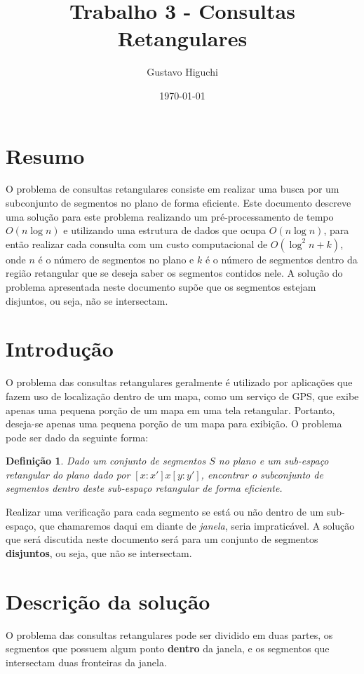 \documentclass{article}
\title{Trabalho 3 - Consultas Retangulares}
\author{Gustavo Higuchi}
\date{\today}
\newtheorem{definicao}{Definição}
\theoremstyle{definition}
\begin{document}
\maketitle
\newpage
\tableofcontents
\newpage
\section{Resumo}
\hspace*{15pt} O problema de consultas retangulares consiste em realizar
uma busca por um subconjunto de segmentos no plano de forma eficiente. 
Este documento descreve uma solução para este problema realizando um 
pré-processamento de tempo $O(n\log n)$ e utilizando uma estrutura de
dados que ocupa $O(n\log n)$, para então realizar cada consulta com um 
custo computacional de $O(\log^2 n + k)$, onde $n$ é o número de segmentos
no plano e $k$ é o número de segmentos dentro da região retangular que 
se deseja saber os segmentos contidos nele. A solução do problema apresentada
neste documento supõe que os segmentos estejam disjuntos, ou seja, não
se intersectam.

\section{Introdução}
\hspace*{15pt} O problema das consultas retangulares geralmente é utilizado
por aplicações que fazem uso de localização dentro de um mapa, como
um serviço de GPS, que exibe apenas uma pequena porção de um mapa em uma
tela retangular. Portanto, deseja-se apenas uma pequena porção de um mapa
para exibição. O problema pode ser dado da seguinte forma:\\
\begin{definicao}
    Dado um conjunto de segmentos $S$ no plano e um sub-espaço retangular 
    do plano dado por $[x:x']x[y:y']$, encontrar o subconjunto de segmentos
    dentro deste sub-espaço retangular de forma eficiente.
\end{definicao}
\hspace*{15pt}Realizar uma verificação para cada segmento se está ou não 
dentro de um sub-espaço, que chamaremos daqui em diante de \textit{janela}, 
seria impraticável. A solução que será discutida neste documento será para 
um conjunto de segmentos \textbf{disjuntos}, ou seja, que não se intersectam. 


\section{Descrição da solução}
\hspace*{15pt} O problema das consultas retangulares pode ser dividido em duas
partes, os segmentos que possuem algum ponto \textbf{dentro} da janela, e os
segmentos que intersectam duas fronteiras da janela.
\end{document}
